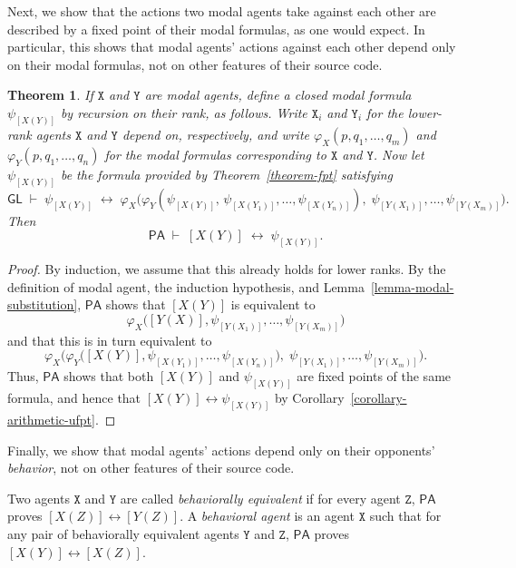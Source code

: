 \documentclass[12pt, letterpaper]{article}
\newtheorem{theorem}{Theorem}[section]
\numberwithin{equation}{section}
\newenvironment{definition}[1][Definition]{\begin{trivlist}
\item[\hskip \labelsep {\bfseries #1}]}{\end{trivlist}}
\begin{document}
Next, we show that the actions two modal agents take against each other are described by a fixed point of their modal formulas, as one would expect. In particular, this shows that modal agents' actions against each other depend only on their modal formulas, not on other features of their source code.

\begin{theorem}
If $\texttt X$ and $\texttt Y$ are modal agents, define a closed modal formula $\psi_{[X(Y)]}$ by recursion on their rank, as follows. Write $\texttt X_i$ and $\texttt Y_i$ for the lower-rank agents $\texttt X$ and $\texttt Y$ depend on, respectively, and write $\varphi_X(p,q_1,\dotsc,q_m)$ and $\varphi_Y(p,q_1,\dotsc,q_n)$ for the modal formulas corresponding to $\texttt X$ and $\texttt Y$. Now let $\psi_{[X(Y)]}$ be the formula provided by Theorem~\ref{theorem-fpt} satisfying
\[
\mathsf{GL}\;\vdash\;\psi_{[X(Y)]}\;\leftrightarrow\;\varphi_X\big(\varphi_Y(\psi_{[X(Y)]},\,\psi_{[X(Y_1)]},\dotsc,\psi_{[X(Y_n)]}),\;\psi_{[Y(X_1)]},\dotsc,\psi_{[Y(X_m)]}\big).
\]
Then
\[
\mathsf{PA} \;\vdash\; [X(Y)]\;\leftrightarrow\;\psi_{[X(Y)]}.
\]
\end{theorem}

\begin{proof}
By induction, we assume that this already holds for lower ranks. By the definition of modal agent, the induction hypothesis, and Lemma~\ref{lemma-modal-substitution}, $\mathsf{PA}$ shows that $[X(Y)]$ is equivalent to
\[
\varphi_X\big([Y(X)],\psi_{[Y(X_1)]},\dotsc,\psi_{[Y(X_m)]}\big)
\]
and that this is in turn equivalent to
\[
\varphi_X\big(\varphi_Y\big([X(Y)],\psi_{[X(Y_1)]},\dotsc,\psi_{[X(Y_n)]}\big),\;\psi_{[Y(X_1)]},\dotsc,\psi_{[Y(X_m)]}\big).
\]
Thus, $\mathsf{PA}$ shows that both $[X(Y)]$ and $\psi_{[X(Y)]}$ are fixed points of the same formula, and hence that $[X(Y)]\leftrightarrow\psi_{[X(Y)]}$ by Corollary~\ref{corollary-arithmetic-ufpt}.
\end{proof}

Finally, we show that modal agents' actions depend only on their opponents' \emph{behavior}, not on other features of their source code.

\begin{definition}
Two agents $\texttt X$ and $\texttt Y$ are called \emph{behaviorally equivalent} if for every agent $\texttt Z$, $\mathsf{PA}$ proves $[X(Z)]\leftrightarrow[Y(Z)]$. A \emph{behavioral agent} is an agent $\texttt X$ such that for any pair of behaviorally equivalent agents $\texttt Y$ and $\texttt Z$, $\mathsf{PA}$ proves $[X(Y)]\leftrightarrow[X(Z)]$.
\end{definition}
\end{document}
